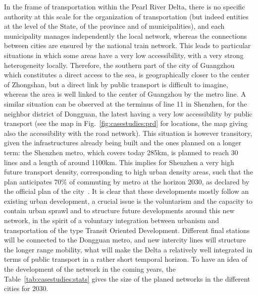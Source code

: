 In the frame of transportation within the Pearl River Delta, there is no specific authority at this scale for the organization of transportation (but indeed entities at the level of the State, of the province and of municipalities), and each municipality manages independently the local network, whereas the connections between cities are ensured by the national train network. This leads to particular situations in which some areas have a very low accessibility, with a very strong heterogeneity locally. Therefore, the southern part of the city of Guangzhou which constitutes a direct access to the sea, is geographically closer to the center of Zhongshan, but a direct link by public transport is difficult to imagine, whereas the area is well linked to the center of Guangzhou by the metro line. A similar situation can be observed at the terminus of line 11 in Shenzhen, for the neighbor district of Dongguan, the latest having a very low accessibility by public transport (see the map in Fig.~\ref{fig:casestudies:prd} for locations, the map giving also the accessibility with the road network). This situation is however transitory, given the infrastructures already being built and the ones planned on a longer term: the Shenzhen metro, which covers today 285km, is planned to reach 30 lines and a length of around 1100km. This implies for Shenzhen a very high future transport density, corresponding to high urban density areas, such that the plan anticipates 70\% of commuting by metro at the horizon 2030, as declared by the official plan of the city~\citep{shenzhen2016plan}. It is clear that these developments mostly follow an existing urban development, a crucial issue is the voluntarism and the capacity to contain urban sprawl and to structure future developments around this new network, in the spirit of a voluntary integration between urbanism and transportation of the type Transit Oriented Development. Different final stations will be connected to the Dongguan metro, and new intercity lines will structure the longer range mobility, what will make the Delta a relatively well integrated in terms of public transport in a rather short temporal horizon. To have an idea of the development of the network in the coming years, the Table~\ref{tab:casestudies:stats} gives the size of the planed networks in the different cities for 2030.



